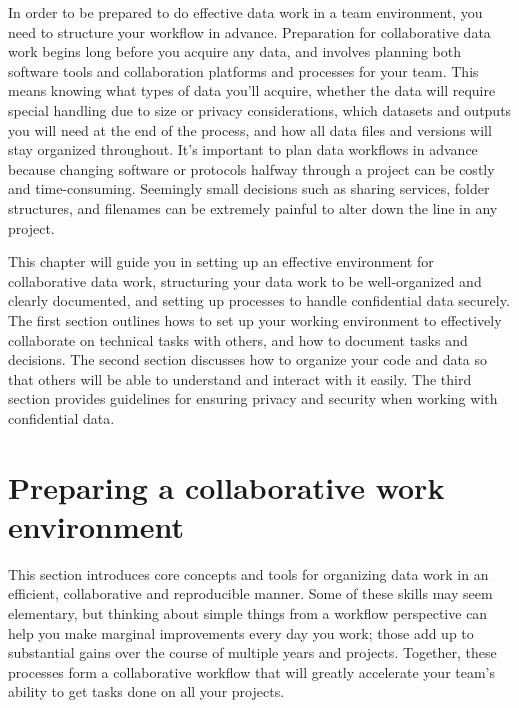 
\begin{fullwidth}
In order to be prepared to do effective data work in a team environment,
you need to structure your workflow in advance.
Preparation for collaborative data work begins long before you acquire any data,
and involves planning both software tools and collaboration platforms and processes for your team.
This means knowing what types of data you'll acquire,
whether the data will require special handling due to size or privacy considerations,
which datasets and outputs you will need at the end of the process,
and how all data files and versions will stay organized throughout.
It's important to plan data workflows in advance because
changing software or protocols halfway through a project can be costly and time-consuming.
Seemingly small decisions such as sharing services, folder structures,
and filenames can be extremely painful to alter down the line in any project.

This chapter will guide you in setting up an effective environment for collaborative data work,
structuring your data work to be well-organized and clearly documented,
and setting up processes to handle confidential data securely.
The first section outlines hows to set up your working environment
to effectively collaborate on technical tasks with others,
and how to document tasks and decisions.
The second section discusses how to organize your code and data so that others
will be able to understand and interact with it easily.
The third section provides guidelines for ensuring
privacy and security when working with confidential data.

\end{fullwidth}


\section{Preparing a collaborative work environment}

This section introduces core concepts and tools
for organizing data work in an efficient, collaborative and reproducible manner.
Some of these skills may seem elementary,
but thinking about simple things from a workflow perspective
can help you make marginal improvements every day you work;
those add up to substantial gains over the course of multiple years and projects.
Together, these processes form a collaborative workflow
that will greatly accelerate your team's ability to get tasks done
on all your projects.


